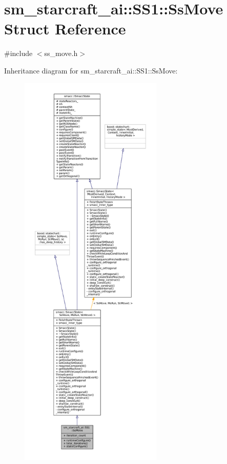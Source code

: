 \hypertarget{structsm__starcraft__ai_1_1SS1_1_1SsMove}{}\section{sm\+\_\+starcraft\+\_\+ai\+:\+:S\+S1\+:\+:Ss\+Move Struct Reference}
\label{structsm__starcraft__ai_1_1SS1_1_1SsMove}


{\ttfamily \#include $<$ss\+\_\+move.\+h$>$}



Inheritance diagram for sm\+\_\+starcraft\+\_\+ai\+:\+:S\+S1\+:\+:Ss\+Move\+:
\nopagebreak
\begin{figure}[H]
\begin{center}
\leavevmode
\includegraphics[height=550pt]{structsm__starcraft__ai_1_1SS1_1_1SsMove__inherit__graph}
\end{center}
\end{figure}


